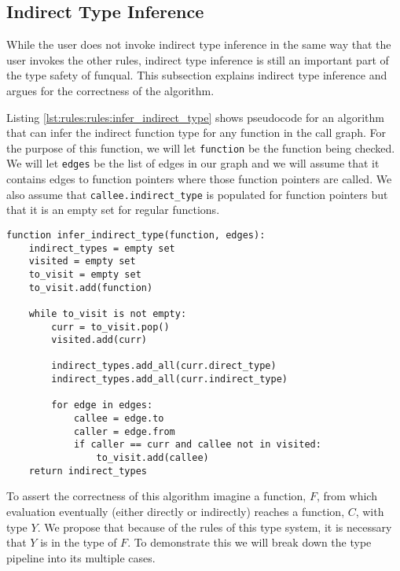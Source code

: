 \subsection{Indirect Type Inference}\label{sec:rules:rules:inference}

While the user does not invoke indirect type inference in the same way that the user invokes the other rules, indirect type inference is still an important part of the type safety of funqual.  This subsection explains indirect type inference and argues for the correctness of the algorithm.  

Listing \ref{lst:rules:rules:infer_indirect_type} shows pseudocode for an algorithm that can infer the indirect function type for any function in the call graph.  For the purpose of this function, we will let \lstinline{function} be the function being checked.  We will let \lstinline{edges} be the list of edges in our graph and we will assume that it contains edges to function pointers where those function pointers are called.  We also assume that \lstinline{callee.indirect_type} is populated for function pointers but that it is an empty set for regular functions.  

\noindent\begin{minipage}[t]{\linewidth}
\begin{lstlisting}[caption={Pseudocode for an algorithm to infer the indirect type of a function.},label={lst:rules:rules:infer_indirect_type}]
function infer_indirect_type(function, edges):
    indirect_types = empty set
    visited = empty set
    to_visit = empty set
    to_visit.add(function)

    while to_visit is not empty:
        curr = to_visit.pop()
        visited.add(curr)

        indirect_types.add_all(curr.direct_type)
        indirect_types.add_all(curr.indirect_type)

        for edge in edges:
            callee = edge.to
            caller = edge.from
            if caller == curr and callee not in visited:
                to_visit.add(callee)
    return indirect_types
\end{lstlisting}
\end{minipage}

To assert the correctness of this algorithm imagine a function, $F$, from which evaluation eventually (either directly or indirectly) reaches a function, $C$, with type $Y$.  We propose that because of the rules of this type system, it is necessary that $Y$ is in the type of $F$.  To demonstrate this we will break down the type pipeline into its multiple cases.

